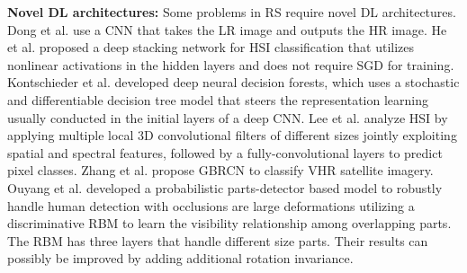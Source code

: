 \documentclass[12pt]{spieman}
\begin{document}
\begin{spacing}{1}
%
%
\textbf{Novel DL architectures:} Some problems in RS require novel DL architectures. Dong et al. \cite{dong2016image} use a CNN that takes the LR image and outputs the HR image. He et al. \cite{He2016Hyperspectral} proposed a deep stacking network for HSI classification that utilizes nonlinear activations in the hidden layers and does not require SGD for training. Kontschieder et al. \cite{kontschieder2015deep} developed deep neural decision forests, which uses a stochastic and differentiable decision tree model that steers the representation learning usually conducted in the initial layers of a deep CNN. Lee et al. \cite{Lee2016Contextual} analyze HSI by applying multiple local 3D convolutional filters of different sizes jointly exploiting spatial and spectral features, followed by a fully-convolutional layers to predict pixel classes. Zhang et al. \cite{zhang2016scene} propose GBRCN to classify VHR satellite imagery. Ouyang et al. \cite{ouyang2012discriminative} developed a probabilistic parts-detector based model to robustly handle human detection with occlusions are large deformations utilizing a discriminative RBM to learn the visibility relationship among overlapping parts. The RBM has three layers that handle different size parts. Their results can possibly be improved by adding additional rotation invariance.



\end{spacing}
\end{document}
